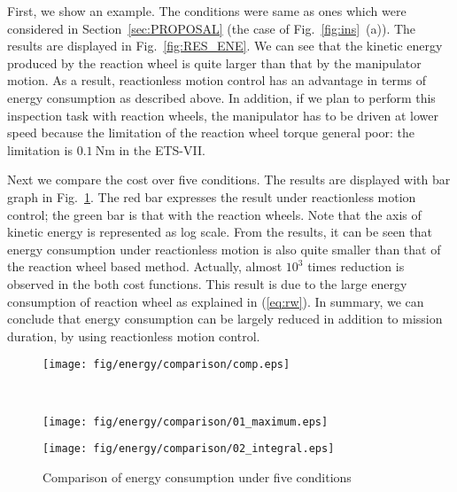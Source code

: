 \documentclass[preprint,12pt]{elsarticle}
\def\fig#1{{Fig.~\ref{fig:#1}}}
\def\eq#1{{(\ref{eq:#1})}}
\def\sec#1{{Section~\ref{sec:#1}}}
\def\unit#1{{~\mathrm{#1}}}
\begin{document}
%
First, we show an example.
The conditions were same as ones which were considered in \sec{PROPOSAL} (the case of \fig{ins}~(a)).
The results are displayed in \fig{RES_ENE}.
We can see that the kinetic energy produced by the reaction wheel is quite larger than
that by the manipulator motion.
As a result, reactionless motion control has an advantage in terms of energy consumption
as described above.
In addition,
if we plan to perform this inspection task with reaction wheels,
the manipulator has to be driven at lower speed because the limitation of the reaction wheel torque
general poor:
the limitation is $0.1\unit{Nm}$ in the ETS-VII.

Next we compare the cost over five conditions.
The results are displayed with bar graph in \fig{RES_ENE_COMP}.
The red bar expresses the result under reactionless motion control;
the green bar is that with the reaction wheels.
Note that the axis of kinetic energy is represented as log scale.
From the results,
it can be seen that energy consumption under reactionless motion is also quite smaller than that of
the reaction wheel based method.
Actually, almost $10^{3}$ times reduction is observed in the both cost functions.
This result is due to the large energy consumption of reaction wheel as explained in \eq{rw}.
In summary, we can conclude that energy consumption can be largely reduced in addition to mission duration,
by using reactionless motion control.

%
\begin{figure}[t]
  \centering
  \begin{minipage}[t]{0.47\linewidth}
    \centering
    \texttt{[image: fig/energy/comparison/comp.eps]}
  \end{minipage}\\
  \vspace{-2mm}
  \begin{minipage}[t]{0.45\linewidth}
    \centering
    \texttt{[image: fig/energy/comparison/01\_maximum.eps]}
  \end{minipage}
  \hspace{-4mm}
  \begin{minipage}[t]{0.45\linewidth}
    \centering
    \texttt{[image: fig/energy/comparison/02\_integral.eps]}
  \end{minipage}
  \caption{Comparison of energy consumption under five conditions}
  \label{fig:RES_ENE_COMP}
\end{figure}
%
\end{document}
